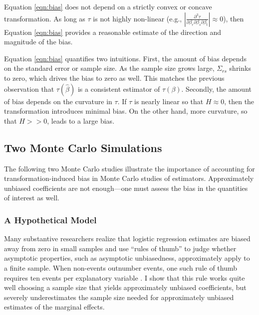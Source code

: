 \documentclass[12pt]{article}
\begin{document}
Equation \ref{eqn:bias} does not depend on a strictly convex or concave transformation. 
As long as $\tau$ is not highly non-linear (e.g., $\left|\frac{\partial^3 \tau}{\partial \beta_r \partial \beta_s \partial \beta_t}\right| \approx 0$), then Equation \ref{eqn:bias} provides a reasonable estimate of the direction and magnitude of the bias.

Equation \ref{eqn:bias} quantifies two intuitions. 
First, the amount of bias depends on the standard error or sample size. 
As the sample size grows large, $\Sigma_{rs}$ shrinks to zero, which drives the bias to zero as well. 
This matches the previous observation that $\tau(\hat{\beta})$ is a consistent estimator of $\tau(\beta)$. 
Secondly, the amount of bias depends on the curvature in $\tau$. 
If $\tau$ is nearly linear so that $H \approx 0$, then the transformation introduces minimal bias. 
On the other hand, more curvature, so that $H >> 0$, leads to a large bias. 

\subsection*{Two Monte Carlo Simulations}

The following two Monte Carlo studies illustrate the importance of accounting for transformation-induced bias in Monte Carlo studies of estimators. 
Approximately unbiased coefficients are not enough---one must assess the bias in the quantities of interest as well. 

\subsubsection*{A Hypothetical Model}

Many substantive researchers realize that logistic regression estimates are biased away from zero in small samples and use ``rules of thumb'' to judge whether asymptotic properties, such as asymptotic unbiasedness, approximately apply to a finite sample.
When non-events outnumber events, one such rule of thumb requires ten events per explanatory variable \citep{Peduzzietal1996}.
I show that this rule works quite well choosing a sample size that yields approximately unbiased coefficients, but severely underestimates the sample size needed for approximately unbiased estimates of the marginal effects.
\end{document}
